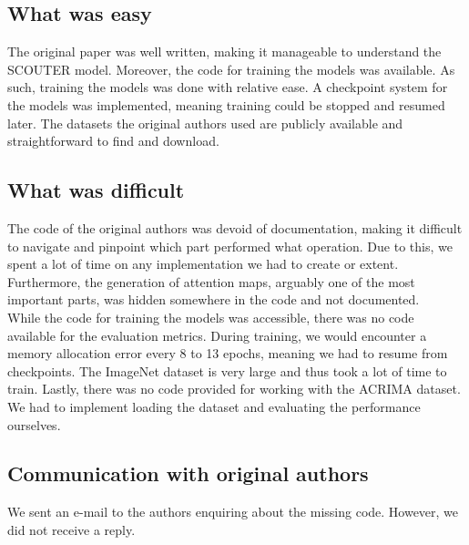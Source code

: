 \subsection{What was easy}
The original paper was well written, making it manageable to understand the SCOUTER model. Moreover, the code for training the models was available. As such, training the models was done with relative ease. A checkpoint system for the models was implemented, meaning training could be stopped and resumed later. The datasets the original authors used are publicly available and straightforward to find and download. 

\subsection{What was difficult}

The code of the original authors was devoid of documentation, making it difficult to navigate and pinpoint which part performed what operation. Due to this, we spent a lot of time on any implementation we had to create or extent. Furthermore, the generation of attention maps, arguably one of the most important parts, was hidden somewhere in the code and not documented.
\\
While the code for training the models was accessible, there was no code available for the evaluation metrics.
During training, we would encounter a memory allocation error every 8 to 13 epochs, meaning we had to resume from checkpoints. The ImageNet dataset is very large and thus took a lot of time to train.
Lastly, there was no code provided for working with the ACRIMA dataset. We had to implement loading the dataset and evaluating the performance ourselves.

\subsection{Communication with original authors}
We sent an e-mail to the authors enquiring about the missing code. However, we did not receive a reply.

%
%

